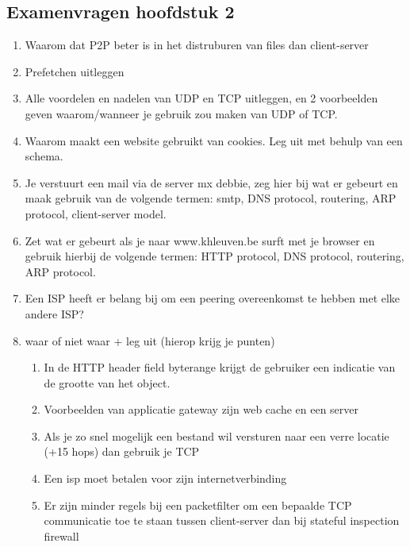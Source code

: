 \subsection{Examenvragen hoofdstuk 2}
\begin{enumerate}
\item Waarom dat P2P beter is in het distruburen van files dan client-server

\item Prefetchen uitleggen

\item Alle voordelen en nadelen van UDP en TCP uitleggen, en 2 voorbeelden geven waarom/wanneer je gebruik zou maken van UDP of TCP.

\item Waarom maakt een website gebruikt van cookies. Leg uit met behulp van een schema.

\item Je verstuurt een mail via de server mx debbie, zeg hier bij wat er gebeurt en maak gebruik van de volgende termen: smtp, DNS protocol, routering, ARP protocol, client-server model.

\item Zet wat er gebeurt als je naar www.khleuven.be surft met je browser en gebruik hierbij de volgende termen: HTTP protocol, DNS protocol, routering, ARP protocol.

\item Een ISP heeft er belang bij om een peering overeenkomst te hebben met elke andere ISP?

\clearpage

\item waar of niet waar + leg uit (hierop krijg je punten)

    \begin{enumerate}
        \item In de HTTP header field byterange krijgt de gebruiker een indicatie van de grootte van het object.

        \item Voorbeelden van applicatie gateway zijn web cache en een server

        \item Als je zo snel mogelijk een bestand wil versturen naar een verre locatie (+15 hops) dan gebruik je TCP

        \item Een isp moet betalen voor zijn internetverbinding

        \item Er zijn minder regels bij een packetfilter om een bepaalde TCP communicatie toe te staan tussen client-server dan bij stateful inspection firewall


\end{enumerate}
\end{enumerate}
